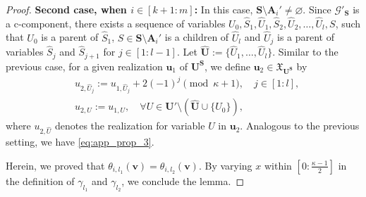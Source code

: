 \documentclass[accepted]{uai2022}
\newcommand{\U}[0]{\mathbf{U}}
\newcommand{\A}[0]{\mathbf{A}}
\newcommand{\G}[0]{\mathcal{G}}
\newcommand{\dom}[1]{\mathfrak{X}_{#1}}
\begin{document}
\begin{proof}
        \textbf{Second case, when $i \in [k+1:m]$:} 
        In this case, $\mathbf{S} \setminus \A_i'\neq \varnothing$.  
        Since $\G'_{\mathbf{S}}$ is a c-component, there exists a sequence of variables $U_0, \hat{S}_1, \hat{U}_1, \hat{S}_2, \hat{U}_2, \dots, \hat{U}_l, S$, such that $U_0$ is a parent of $\hat{S}_1$, $S\in \mathbf{S}\setminus \A_i'$ is a children of $\hat{U}_l$ and $\hat{U}_j$ is a parent of variables $\hat{S}_j$ and  $\hat{S}_{j+1}$ for $j \in [1:l-1]$. 
        Let $\hat{\U}:=\{\hat{U}_1, \dots, \hat{U}_l\}$. 
        Similar to the previous case, for a given realization $\mathbf{u}_{1}$ of $\U^{\mathbf{S}}$,  we define $\mathbf{u}_{2} \in \dom{\U^{\mathbf{S}}}$ by
        \begin{equation}
            \begin{split}
                & u_{2,\hat{U}_j} := u_{1,\hat{U}_j} + 2(-1)^{j} \pmod{\kappa+1}, \quad j\in[1:l],\\
                & u_{2,U} := u_{1,U}, \quad \forall U\in \U' \setminus (\hat{\U}\cup \{U_0\}),
            \end{split}
        \end{equation}
        where $u_{2,\hat{U}}$ denotes the realization for variable $U$ in $\textbf{u}_2$. Analogous to the previous setting, we have \eqref{eq:app_prop_3}.
        
        Herein, we proved that $\theta_{i, l_1}(\mathbf{v})=\theta_{i, l_2}(\mathbf{v})$. By varying $x$ within $[0 : \frac{\kappa-1}{2}]$ in the definition of $\gamma_{l_1}$ and $\gamma_{l_2}$, we  conclude the lemma.
    \end{proof}
\end{document}
